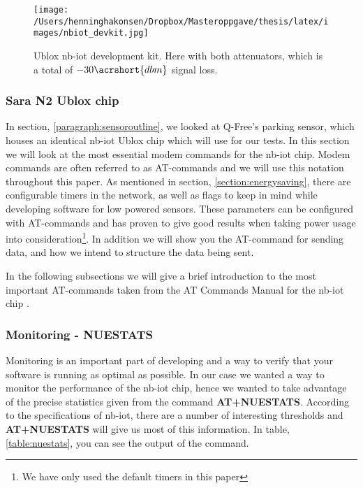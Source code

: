\documentclass[USenglish]{ifimaster}  %
\begin{document}
\begin{figure}[ht]
  \centering\texttt{[image: /Users/henninghakonsen/Dropbox/Masteroppgave/thesis/latex/images/nbiot\_devkit.jpg]}
  \caption{Ublox \acrshort{nb-iot} development kit. Here with both attenuators, which is a total of ${-30\acrshort{dbm}}$ signal loss.}
  \label{pic:nbiotdevkit}
\end{figure}

\subsubsection{Sara N2 Ublox chip} \label{section:thechip}
In section, \vref{paragraph:sensoroutline}, we looked at Q-Free's parking sensor, which houses an identical \acrshort{nb-iot} Ublox chip which will use for our tests. In this section we will look at the most essential modem commands for the \acrshort{nb-iot} chip. Modem commands are often referred to as AT-commands and we will use this notation throughout this paper. As mentioned in section, \vref{section:energysaving}, there are configurable timers in the network, as well as flags to keep in mind while developing software for low powered sensors. These parameters can be configured with AT-commands and has proven to give good results when taking power usage into consideration\footnote{We have only used the default timers in this paper}. In addition we will show you the AT-command for sending data, and how we intend to structure the data being sent.

In the following subsections we will give a brief introduction to the most important AT-commands taken from the AT Commands Manual for the \acrshort{nb-iot} chip \cite{atcommand:ubloxchip}.

\subsubsection{Monitoring - NUESTATS}
Monitoring is an important part of developing and a way to verify that your software is running as optimal as possible. In our case we wanted a way to monitor the performance of the \acrshort{nb-iot} chip, hence we wanted to take advantage of the precise statistics given from the command \textbf{AT+NUESTATS}. According to the specifications of \acrshort{nb-iot}, there are a number of interesting thresholds and \textbf{AT+NUESTATS} will give us most of this information. In table, \vref{table:nuestats}, you can see the output of the command.
\end{document}
